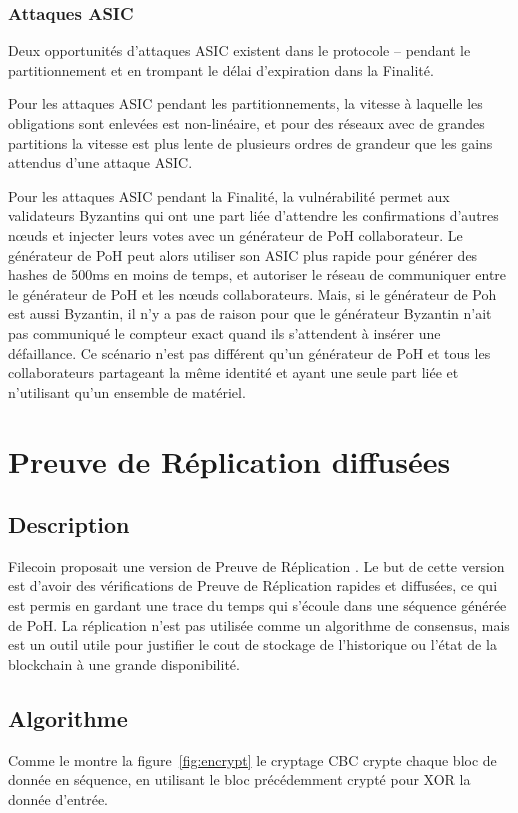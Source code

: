 \documentclass[12pt]{article}
\begin{document}
\subsubsection{Attaques ASIC}\label{Censure}

Deux opportunités d’attaques ASIC existent dans le protocole – pendant le partitionnement et en trompant le délai d’expiration dans la Finalité.

Pour les attaques ASIC pendant les partitionnements, la vitesse à laquelle les obligations sont enlevées est non-linéaire, et pour des réseaux avec de grandes partitions la vitesse est plus lente de plusieurs ordres de grandeur que les gains attendus d’une attaque ASIC.

Pour les attaques ASIC pendant la Finalité, la vulnérabilité permet aux validateurs Byzantins qui ont une part liée d’attendre les confirmations d’autres nœuds et injecter leurs votes avec un générateur de PoH collaborateur. Le générateur de PoH peut alors utiliser son ASIC plus rapide pour générer des hashes de 500ms en moins de temps, et autoriser le réseau de communiquer entre le générateur de PoH et les nœuds collaborateurs. Mais, si le générateur de Poh est aussi Byzantin, il n’y a pas de raison pour que le générateur Byzantin n’ait pas communiqué le compteur exact quand ils s’attendent à insérer une défaillance. Ce scénario n’est pas différent qu’un générateur de PoH et tous les collaborateurs partageant la même identité et ayant une seule part liée et n’utilisant qu’un ensemble de matériel.

\section{Preuve de Réplication diffusées}\label{porep}
\subsection{Description}
Filecoin proposait une version de Preuve de Réplication \cite{filecoinporep}. Le but de cette version est d’avoir des vérifications de Preuve de Réplication rapides et diffusées, ce qui est permis en gardant une trace du temps qui s’écoule dans une séquence générée de PoH. La réplication n’est pas utilisée comme un algorithme de consensus, mais est un outil utile pour justifier le cout de stockage de l’historique ou l’état de la blockchain à une grande disponibilité.
\subsection{Algorithme}
Comme le montre la figure~\ref{fig:encrypt} le cryptage CBC crypte chaque bloc de donnée en séquence, en utilisant le bloc précédemment crypté pour XOR la donnée d’entrée.
\end{document}
